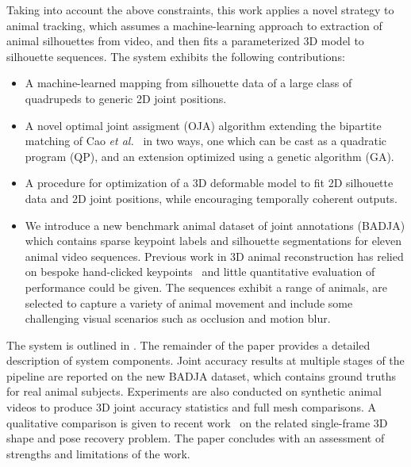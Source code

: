 

Taking into account the above constraints, this work applies a novel strategy to animal tracking, which assumes a machine-learning approach to extraction of animal silhouettes from video, and then fits a parameterized 3D model to silhouette sequences.  The system exhibits the following contributions:
\begin{itemize}
\item A machine-learned mapping from silhouette data of a large class of quadru\-peds to generic 2D joint positions.
\item A novel optimal joint assigment (OJA) algorithm extending the bipartite matching of Cao {\em et al.}~\cite{cao2017realtime} in two ways, one which can be cast as a quadratic program (QP), and an extension optimized using a genetic algorithm (GA).
\item A procedure for optimization of a 3D deformable model to fit 2D silhouette data and 2D joint positions, while encouraging temporally coherent outputs.
\item We introduce a new benchmark animal dataset of joint annotations (BADJA) which contains sparse keypoint labels and silhouette segmentations for eleven animal video sequences. 
Previous work in 3D animal reconstruction has relied on bespoke hand-clicked keypoints~\cite{zuffi2017menagerie,zuffi_lions} and little quantitative evaluation of performance could be given.
The sequences exhibit a range of animals, are selected to capture a variety of animal movement and include some challenging visual scenarios such as occlusion and motion blur.
\end{itemize}

The system is outlined in .  The remainder of the paper provides a detailed description of system components.  Joint accuracy results at multiple stages of the pipeline are reported on the new BADJA dataset, which contains ground truths for real animal subjects. Experiments are also conducted on synthetic animal videos to produce 3D joint accuracy statistics and full mesh comparisons. A qualitative comparison is given to recent work~\cite{zuffi2017menagerie} on the related single-frame 3D shape and pose recovery problem. The paper concludes with an assessment of strengths and limitations of the work.


